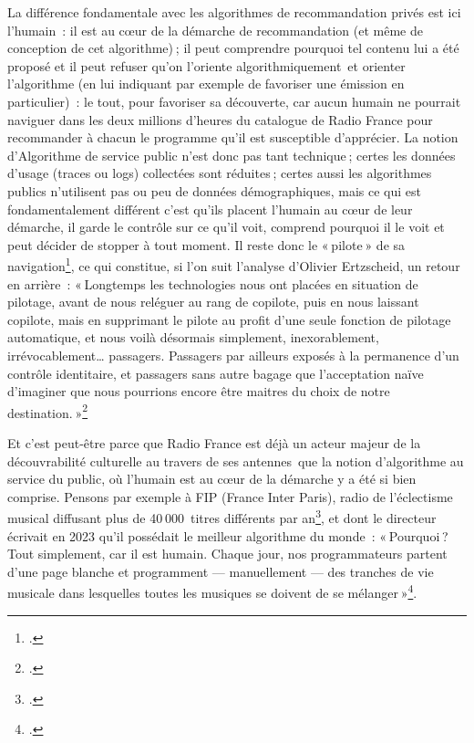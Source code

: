 La différence fondamentale avec les algorithmes de recommandation privés est ici l’humain : il est au cœur de la démarche de recommandation (et même de conception de cet algorithme) ; il peut comprendre pourquoi tel contenu lui a été proposé et il peut refuser qu’on l’oriente algorithmiquement et orienter l’algorithme (en lui indiquant par exemple de favoriser une émission en particulier) : le tout, pour favoriser sa découverte, car aucun humain ne pourrait naviguer dans les deux millions d’heures du catalogue de Radio France pour recommander à chacun le programme qu’il est susceptible d’apprécier. La notion d’Algorithme de service public n’est donc pas tant technique ; certes les données d’usage (traces ou logs) collectées sont réduites ; certes aussi les algorithmes publics n’utilisent pas ou peu de données démographiques, mais ce qui est fondamentalement différent c’est qu’ils placent l’humain au cœur de leur démarche, il garde le contrôle sur ce qu’il voit, comprend pourquoi il le voit et peut décider de stopper à tout moment. Il reste donc le « pilote » de sa navigation\footcite{ertzscheid2024a}, ce qui constitue, si l’on suit l’analyse d’Olivier Ertzscheid, un retour en arrière : 
« Longtemps les technologies nous ont placées en situation de pilotage, avant de nous reléguer au rang de copilote, puis en nous laissant copilote, mais en supprimant le pilote au profit d’une seule fonction de pilotage automatique, et nous voilà désormais simplement, inexorablement, irrévocablement… passagers. Passagers par ailleurs exposés à la permanence d’un contrôle identitaire, et passagers sans autre bagage que l’acceptation naïve d’imaginer que nous pourrions encore être maitres du choix de notre destination. »\footcite{ertzscheid2024a}

Et c’est peut-être parce que Radio France est déjà un acteur majeur de la découvrabilité culturelle au travers de ses antennes que la notion d’algorithme au service du public, où l’humain est au cœur de la démarche y a été si bien comprise. Pensons par exemple à FIP (France Inter Paris), radio de l’éclectisme musical diffusant plus de 40 000 titres différents par an\footcite{2023a}, et dont le directeur écrivait en 2023 qu’il possédait le meilleur algorithme du monde : « Pourquoi ? Tout simplement, car il est humain. Chaque jour, nos programmateurs partent d’une page blanche et programment — manuellement — des tranches de vie musicale dans lesquelles toutes les musiques se doivent de se mélanger »\footcite{2023a}.


